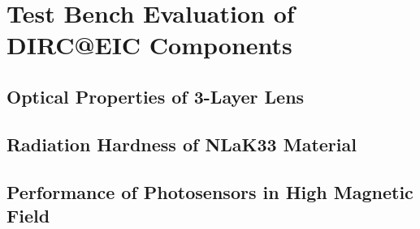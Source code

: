\chapter{Test Bench Evaluation of DIRC@EIC Components}
\section{Optical Properties of 3-Layer Lens}
\section{Radiation Hardness of NLaK33 Material}
\section{Performance of Photosensors in High Magnetic Field}